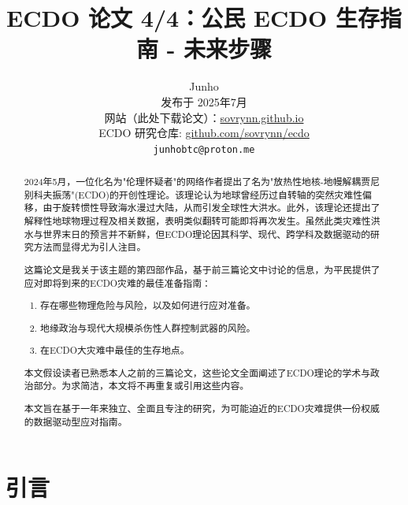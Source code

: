 \documentclass[10pt,twocolumn,letterpaper]{article}
\begin{document}
\title{ECDO 论文 4/4：公民 ECDO 生存指南 - 未来步骤}

\author{Junho\\
发布于 2025年7月\\
网站（此处下载论文）：\href{https://sovrynn.github.io}{sovrynn.github.io}\\
ECDO 研究仓库: \href{https://github.com/sovrynn/ecdo}{github.com/sovrynn/ecdo}\\
{\tt\small junhobtc@proton.me}
}

\maketitle

\begin{abstract}
2024年5月，一位化名为"伦理怀疑者"的网络作者\cite{0}提出了名为"放热性地核-地幔解耦贾尼别科夫振荡"(ECDO)\cite{1}的开创性理论。该理论认为地球曾经历过自转轴的突然灾难性偏移，由于旋转惯性导致海水漫过大陆，从而引发全球性大洪水。此外，该理论还提出了解释性地球物理过程及相关数据，表明类似翻转可能即将再次发生。虽然此类灾难性洪水与世界末日的预言并不新鲜，但ECDO理论因其科学、现代、跨学科及数据驱动的研究方法而显得尤为引人注目。

这篇论文是我关于该主题的第四部作品\cite{2,3}，基于前三篇论文中讨论的信息，为平民提供了应对即将到来的ECDO灾难的最佳准备指南：
\begin{flushleft}
\begin{enumerate}
    \item 存在哪些物理危险与风险，以及如何进行应对准备。
    \item 地缘政治与现代大规模杀伤性人群控制武器的风险。
    \item 在ECDO大灾难中最佳的生存地点。
\end{enumerate}
\end{flushleft}
本文假设读者已熟悉本人之前的三篇论文\cite{3}，这些论文全面阐述了ECDO理论的学术与政治部分。为求简洁，本文将不再重复或引用这些内容。

本文旨在基于一年来独立、全面且专注的研究，为可能迫近的ECDO灾难提供一份权威的数据驱动型应对指南。
\end{abstract}
\section{引言}
\end{document}
